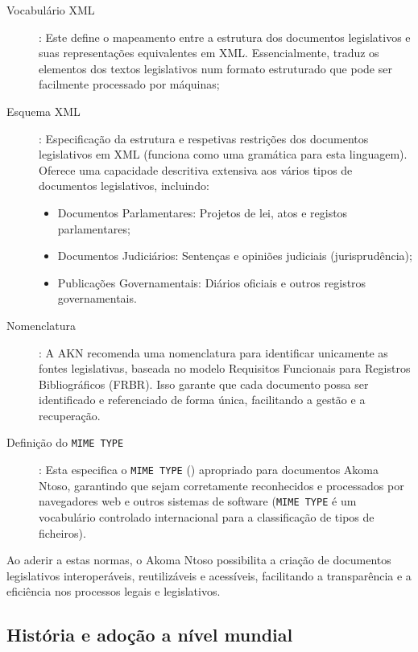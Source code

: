 \begin{description}
\item[Vocabulário XML]: Este define o mapeamento entre a estrutura dos documentos legislativos e suas representações equivalentes 
em XML. Essencialmente, traduz os elementos dos textos legislativos num formato estruturado que pode ser facilmente processado por 
máquinas;

\item[Esquema XML]: Especificação da estrutura e respetivas restrições dos documentos legislativos em XML (funciona como uma gramática 
para esta linguagem). 
Oferece uma capacidade descritiva extensiva aos vários tipos de documentos legislativos, incluindo:
    \begin{itemize}
        \item Documentos Parlamentares: Projetos de lei, atos e registos parlamentares;
        \item Documentos Judiciários: Sentenças e opiniões judiciais (jurisprudência);
        \item Publicações Governamentais: Diários oficiais e outros registros governamentais.
    \end{itemize}

\item[Nomenclatura]: A AKN recomenda uma nomenclatura para identificar unicamente as fontes legislativas, 
baseada no modelo Requisitos Funcionais para Registros Bibliográficos (FRBR). 
Isso garante que cada documento possa ser identificado e referenciado de forma única, facilitando a gestão e a recuperação.

\item[Definição do \texttt{MIME TYPE}]: Esta especifica o \texttt{MIME TYPE} (\cite{Freed2012}) apropriado para documentos Akoma Ntoso, 
garantindo que sejam corretamente reconhecidos e processados por navegadores web e outros sistemas de software (\texttt{MIME TYPE} 
é um vocabulário controlado internacional para a classificação de tipos de ficheiros).

\end{description}

Ao aderir a estas normas, o Akoma Ntoso possibilita a criação de documentos legislativos interoperáveis, reutilizáveis 
e acessíveis, facilitando a transparência e a eficiência nos processos legais e legislativos.


\subsection{História e adoção a nível mundial}

